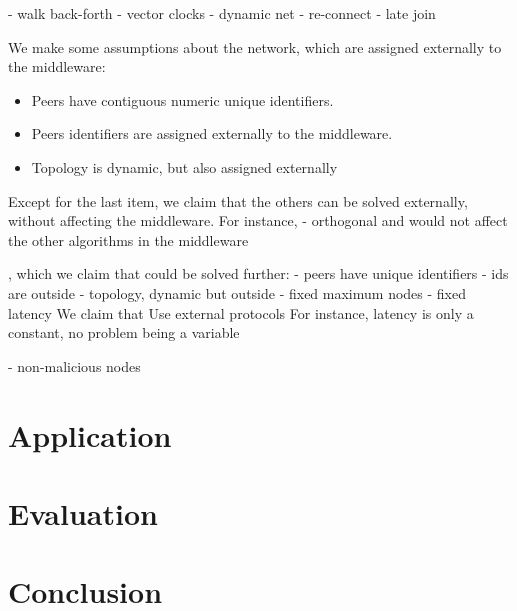 \documentclass[10pt,journal,compsoc]{IEEEtran}
\begin{document}
- walk back-forth
- vector clocks
- dynamic net
- re-connect
- late join

We make some assumptions about the network, which are assigned externally to
the middleware:
%
\begin{itemize}
\item Peers have contiguous numeric unique identifiers.
\item Peers identifiers are assigned externally to the middleware.
\item Topology is dynamic, but also assigned externally

\end{itemize}
%
Except for the last item, we claim that the others can be solved externally,
without affecting the middleware.
For instance,
- orthogonal and would not affect the other algorithms in the middleware

, which we claim that could be
solved further:
- peers have unique identifiers
- ids are outside
- topology, dynamic but outside
- fixed maximum nodes
- fixed latency
We claim that Use external protocols
For instance, latency is only a constant, no problem being a variable

- non-malicious nodes

\section{Application}
\label{sec.app}

\section{Evaluation}
\label{sec.eval}

\section{Conclusion}
\label{sec.conclusion}

\end{document}
